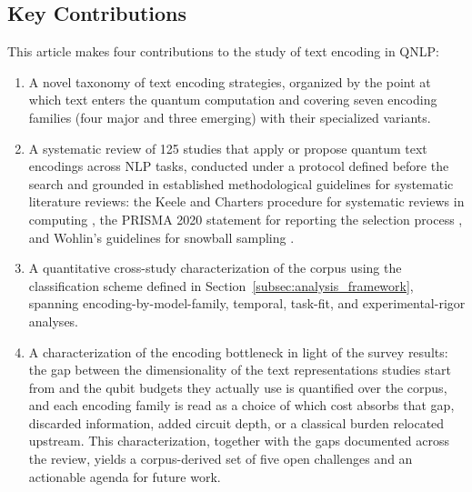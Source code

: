 \documentclass{ieeeaccess}
\begin{document}
\subsection{Key Contributions}
This article makes four contributions to the study of text encoding in QNLP:
\begin{enumerate}
\item[1)] A novel taxonomy of text encoding strategies, organized by the point at which text enters the quantum computation and covering seven encoding families (four major and three emerging) with their specialized variants.
\item[2)] A systematic review of 125 studies that apply or propose quantum text encodings across NLP tasks, conducted under a protocol defined before the search and grounded in established methodological guidelines for systematic literature reviews: the Keele and Charters procedure for systematic reviews in computing \cite{keele2007guidelines}, the PRISMA 2020 statement for reporting the selection process \cite{page2021prisma}, and Wohlin's guidelines for snowball sampling \cite{wohlin2014guidelines}.
\item[3)] A quantitative cross-study characterization of the corpus using the classification scheme defined in Section~\ref{subsec:analysis_framework}, spanning encoding-by-model-family, temporal, task-fit, and experimental-rigor analyses.
\item[4)] A characterization of the encoding bottleneck in light of the survey results: the gap between the dimensionality of the text representations studies start from and the qubit budgets they actually use is quantified over the corpus, and each encoding family is read as a choice of which cost absorbs that gap, discarded information, added circuit depth, or a classical burden relocated upstream. This characterization, together with the gaps documented across the review, yields a corpus-derived set of five open challenges and an actionable agenda for future work.
\end{enumerate}
\end{document}
